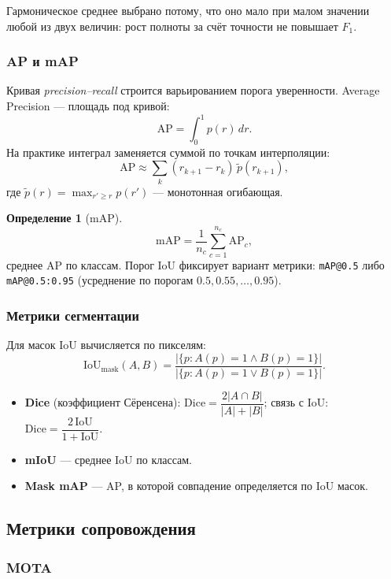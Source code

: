 \documentclass[11pt,a4paper]{article}
\theoremstyle{definition}
\newtheorem{definition}{Определение}[section]
\theoremstyle{remark}
\begin{document}
Гармоническое среднее выбрано потому, что оно мало при малом значении любой
из двух величин: рост полноты за счёт точности не повышает $F_1$.

\subsubsection{AP и mAP}

Кривая \emph{precision--recall} строится варьированием порога уверенности.
Average Precision --- площадь под кривой:
\[
  \mathrm{AP} = \int_0^1 p(r)\,dr .
\]
На практике интеграл заменяется суммой по точкам интерполяции:
\[
  \mathrm{AP} \approx \sum_k (r_{k+1} - r_k)\,\tilde{p}(r_{k+1}),
\]
где $\tilde{p}(r) = \max_{r' \ge r} p(r')$ --- монотонная огибающая.

\begin{definition}[mAP]
\[
  \mathrm{mAP} = \frac{1}{n_c}\sum_{c=1}^{n_c} \mathrm{AP}_c ,
\]
среднее AP по классам. Порог $\mathrm{IoU}$ фиксирует вариант метрики:
\texttt{mAP@0.5} либо \texttt{mAP@0.5:0.95} (усреднение по порогам
$0.5, 0.55, \dots, 0.95$).
\end{definition}

\subsubsection{Метрики сегментации}

Для масок $\mathrm{IoU}$ вычисляется по пикселям:
\[
  \mathrm{IoU}_{\text{mask}}(A,B)
  = \frac{|\{p : A(p) = 1 \wedge B(p) = 1\}|}
         {|\{p : A(p) = 1 \vee B(p) = 1\}|}.
\]

\begin{itemize}
  \item \textbf{Dice} (коэффициент Сёренсена):
        $\mathrm{Dice} = \dfrac{2|A \cap B|}{|A| + |B|}$;
        связь с $\mathrm{IoU}$: $\mathrm{Dice} =
        \dfrac{2\,\mathrm{IoU}}{1 + \mathrm{IoU}}$.
  \item \textbf{mIoU} --- среднее $\mathrm{IoU}$ по классам.
  \item \textbf{Mask mAP} --- AP, в которой совпадение определяется по
        $\mathrm{IoU}$ масок.
\end{itemize}

\subsection{Метрики сопровождения}

\subsubsection{MOTA}
\end{document}
